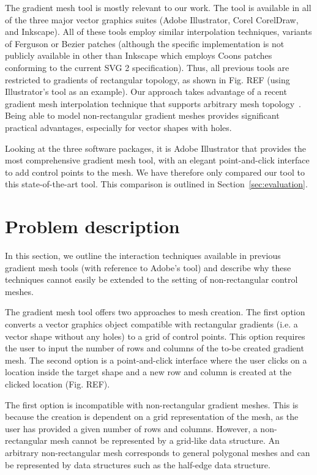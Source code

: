 \documentclass{egpubl}
\begin{document}
The gradient mesh tool is mostly relevant to our work. The tool is available in all of the three major vector graphics suites (Adobe Illustrator, Corel CorelDraw, and Inkscape). All of these tools employ similar interpolation techniques, variants of Ferguson or Bezier patches (although the specific implementation is not publicly available in other than Inkscape which employs Coons patches conforming to the current SVG 2 specification). Thus, all previous tools are restricted to gradients of rectangular topology, as shown in Fig. REF (using Illustrator's tool as an example). Our approach takes advantage of a recent gradient mesh interpolation technique that supports arbitrary mesh topology~\cite{Lieng:2016}. Being able to model non-rectangular gradient meshes provides significant practical advantages, especially for vector shapes with holes.

Looking at the three software packages, it is Adobe Illustrator that provides the most comprehensive gradient mesh tool, with an elegant point-and-click interface to add control points to the mesh. We have therefore only compared our tool to this state-of-the-art tool. This comparison is outlined in Section~\ref{sec:evaluation}.

\section{Problem description}
\label{sec:overview}

In this section, we outline the interaction techniques available in previous gradient mesh tools (with reference to Adobe's tool) and describe why these techniques cannot easily be extended to the setting of non-rectangular control meshes.

The gradient mesh tool offers two approaches to mesh creation. The first option converts a vector graphics object compatible with rectangular gradients (i.e. a vector shape without any holes) to a grid of control points. This option requires the user to input the number of rows and columns of the to-be created gradient mesh. The second option is a point-and-click interface where the user clicks on a location inside the target shape and a new row and column is created at the clicked location (Fig. REF).

The first option is incompatible with non-rectangular gradient meshes. This is because the creation is dependent on a grid representation of the mesh, as the user has provided a given number of rows and columns. However, a non-rectangular mesh cannot be represented by a grid-like data structure. An arbitrary non-rectangular mesh corresponds to general polygonal meshes and can be represented by data structures such as the half-edge data structure.
\end{document}
